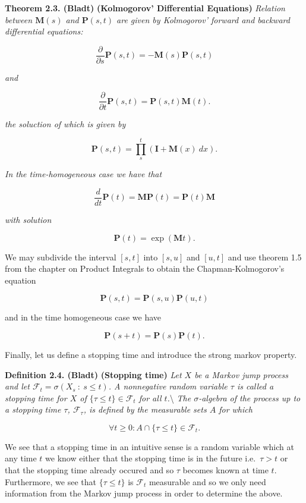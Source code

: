 \documentclass[a4paper,12pt,openany]{book}
\begin{document}
\textbf{Theorem 2.3. (Bladt)} \textbf{(Kolmogorov' Differential Equations)} \emph{Relation between \(\mathbf{M}(s)\) and \(\mathbf{P}(s,t)\) are given by Kolmogorov' forward and backward differential equations:}

\[
\frac{\partial}{\partial s}\mathbf{P}(s,t)=-\mathbf{M}(s)\mathbf{P}(s,t)
\]

\emph{and}

\[
\frac{\partial}{\partial t}\mathbf{P}(s,t)=\mathbf{P}(s,t)\mathbf{M}(t).
\]

\emph{the soluction of which is given by}

\[
\mathbf{P}(s,t)=\prod_s^t(\mathbf{I}+\mathbf{M}(x)\ dx).
\]

\emph{In the time-homogeneous case we have that}

\[
\frac{d}{d t}\mathbf{P}(t)=\mathbf{M}\mathbf{P}(t)=\mathbf{P}(t)\mathbf{M}
\]

\emph{with solution}

\[
\mathbf{P}(t)=\exp(\mathbf{M}t).
\]

We may subdivide the interval \([s,t]\) into \([s,u]\) and \([u,t]\) and use theorem 1.5 from the chapter on Product Integrals to obtain the Chapman-Kolmogorov's equation

\[
\mathbf{P}(s,t)=\mathbf{P}(s,u)\mathbf{P}(u,t)
\]

and in the time homogeneous case we have

\[
\mathbf{P}(s+t)=\mathbf{P}(s)\mathbf{P}(t).
\]

Finally, let us define a stopping time and introduce the strong markov property.

\textbf{Definition 2.4. (Bladt)} \textbf{(Stopping time)} \emph{Let \(X\) be a Markov jump process and let \(\mathcal{F}_t=\sigma(X_s\ :\ s\le t)\). A nonnegative random variable \(\tau\) is called a stopping time for \(X\) of \(\{\tau \le t\}\in\mathcal{F}_t\) for all \(t\).}\textbackslash{}
\emph{The \(\sigma\)-algebra of the process up to a stopping time \(\tau\), \(\mathcal{F}_\tau\), is defined by the measurable sets \(A\) for which}

\[
\forall t\ge 0 : A\cap \{\tau\le t\}\in\mathcal{F}_t.
\]

We see that a stopping time in an intuitive sense is a random variable which at any time \(t\) we know either that the stopping time is in the future i.e.~\(\tau > t\) or that the stopping time already occured and so \(\tau\) becomes known at time \(t\). Furthermore, we see that \(\{\tau \le t\}\) is \(\mathcal{F}_t\) measurable and so we only need information from the Markov jump process in order to determine the above.
\end{document}
